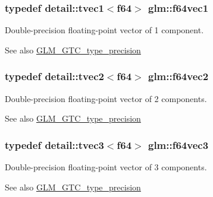 \subsubsection[{f64vec1}]{\setlength{\rightskip}{0pt plus 5cm}typedef detail\+::tvec1$<$f64$>$ {\bf glm\+::f64vec1}}\label{group__gtc__type__precision_ga9dabdd8a91258b035759121fa7880cb6}
Double-\/precision floating-\/point vector of 1 component. \begin{DoxySeeAlso}{See also}
\hyperlink{group__gtc__type__precision}{G\+L\+M\+\_\+\+G\+T\+C\+\_\+type\+\_\+precision} 
\end{DoxySeeAlso}
\hypertarget{group__gtc__type__precision_gabffd600c237af59b1686fce1ef461a84}{}
\subsubsection[{f64vec2}]{\setlength{\rightskip}{0pt plus 5cm}typedef detail\+::tvec2$<$f64$>$ {\bf glm\+::f64vec2}}\label{group__gtc__type__precision_gabffd600c237af59b1686fce1ef461a84}
Double-\/precision floating-\/point vector of 2 components. \begin{DoxySeeAlso}{See also}
\hyperlink{group__gtc__type__precision}{G\+L\+M\+\_\+\+G\+T\+C\+\_\+type\+\_\+precision} 
\end{DoxySeeAlso}
\hypertarget{group__gtc__type__precision_ga31fd7a60d11d5ce44f3fad7418c93ec5}{}
\subsubsection[{f64vec3}]{\setlength{\rightskip}{0pt plus 5cm}typedef detail\+::tvec3$<$f64$>$ {\bf glm\+::f64vec3}}\label{group__gtc__type__precision_ga31fd7a60d11d5ce44f3fad7418c93ec5}
Double-\/precision floating-\/point vector of 3 components. \begin{DoxySeeAlso}{See also}
\hyperlink{group__gtc__type__precision}{G\+L\+M\+\_\+\+G\+T\+C\+\_\+type\+\_\+precision} 
\end{DoxySeeAlso}
\hypertarget{group__gtc__type__precision_ga5032a5abd2c2a1f18927c9eeef088c7b}{}
